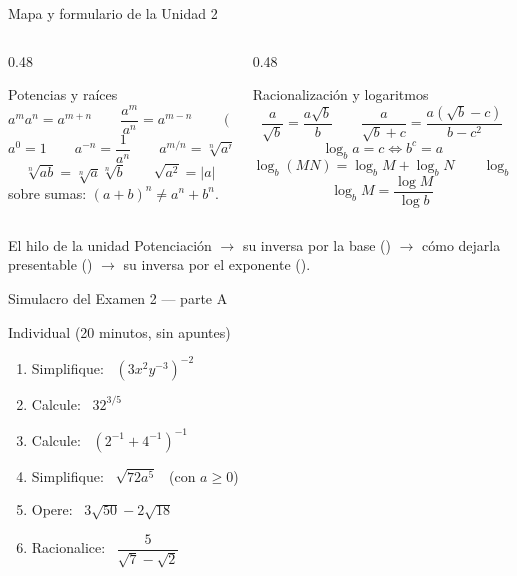 \documentclass[aspectratio=169,10pt]{beamer}
\begin{document}
\begin{frame}{Mapa y formulario de la Unidad 2}
  \tiny
  \begin{columns}[T,onlytextwidth]
    \begin{column}{0.48\textwidth}
      \begin{block}{Potencias y raíces}
        \tiny
        \[ a^{m}a^{n}=a^{m+n} \qquad \frac{a^{m}}{a^{n}}=a^{m-n} \qquad
           (a^{m})^{n}=a^{mn} \]
        \[ a^{0}=1 \qquad a^{-n}=\frac{1}{a^{n}} \qquad
           a^{m/n}=\sqrt[n]{a^{m}} \]
        \[ \sqrt[n]{ab}=\sqrt[n]{a}\sqrt[n]{b} \qquad
           \sqrt{a^{2}}=|a| \]
         sobre sumas: $(a+b)^n \neq a^n+b^n$.
      \end{block}
    \end{column}
    \begin{column}{0.48\textwidth}
      \begin{block}{Racionalización y logaritmos}
        \tiny
        \[ \frac{a}{\sqrt{b}}=\frac{a\sqrt{b}}{b} \qquad
           \frac{a}{\sqrt{b}+c}=\frac{a(\sqrt{b}-c)}{b-c^{2}} \]
        \[ \log_{b}a=c \Leftrightarrow b^{c}=a \]
        \[ \log_{b}(MN)=\log_b M+\log_b N \qquad
           \log_{b}M^{p}=p\log_b M \]
        \[ \log_{b}M=\frac{\log M}{\log b} \]
      \end{block}
    \end{column}
  \end{columns}

  \vspace{0.05cm}
  \begin{alertblock}{El hilo de la unidad}
    \tiny
    Potenciación $\rightarrow$ su inversa por la base ()
    $\rightarrow$ cómo dejarla presentable ()
    $\rightarrow$ su inversa por el exponente ().
  \end{alertblock}
\end{frame}

\begin{frame}{Simulacro del Examen 2 — parte A}
  \begin{alertblock}{Individual (20 minutos, sin apuntes)}
    \scriptsize
    \begin{enumerate}\setlength{\itemsep}{0.04cm}
      \item Simplifique: \ $\left(3x^{2}y^{-3}\right)^{-2}$
      \item Calcule: \ $32^{3/5}$
      \item Calcule: \ $\left(2^{-1}+4^{-1}\right)^{-1}$
      \item Simplifique: \ $\sqrt{72a^{5}}$ \ (con $a\ge 0$)
      \item Opere: \ $3\sqrt{50}-2\sqrt{18}$
      \item Racionalice: \ $\dfrac{5}{\sqrt{7}-\sqrt{2}}$
    \end{enumerate}
  \end{alertblock}
\end{frame}
\end{document}
